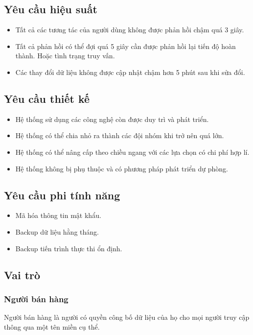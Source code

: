 \documentclass[11pt]{report}
\begin{document}
	\subsection{Yêu cầu hiệu suất}
	\begin{itemize}
		\item Tất cả các tương tác của người dùng không được phản hồi chậm quá 3 giây.
		\item Tất cả phản hồi có thể đợi quá 5 giây cần được phản hồi lại tiến độ hoàn thành. Hoặc tình trạng truy vấn.
		\item Các thay đổi dữ liệu không được cập nhật chậm hơn 5 phút sau khi sửa đổi.
	\end{itemize}
	
	\subsection{Yêu cầu thiết kế}
	\begin{itemize}
		\item Hệ thống sử dụng các công nghệ còn được duy trì và phát triển.
		\item Hệ thống có thể chia nhỏ ra thành các đội nhóm khi trở nên quá lớn.
		\item Hệ thống có thể nâng cấp theo chiều ngang với các lựa chọn có chi phí hợp lí.
		\item Hệ thống không bị phụ thuộc và có phương pháp phát triển dự phòng.
	\end{itemize}
	
	\subsection{Yêu cầu phi tính năng}
	\begin{itemize}
		\item Mã hóa thông tin mật khẩu.
		\item Backup dữ liệu hằng tháng.
		\item Backup tiến trình thực thi ổn định.
	\end{itemize}
	
	\subsection{Vai trò}
	\subsubsection{Người bán hàng}
	Người bán hàng là người có quyền công bố dữ liệu của họ cho mọi người truy cập thông qua một tên miền cụ thể.
	
\end{document}
